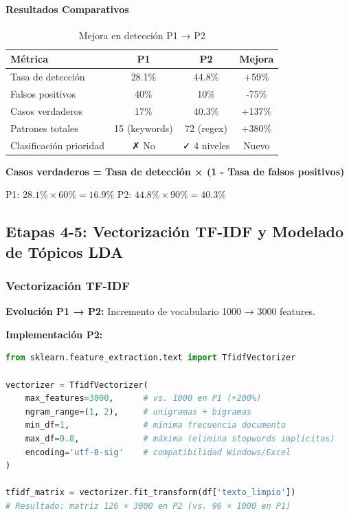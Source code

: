 \paragraph{Resultados Comparativos}

\begin{table}[h]
\centering
\caption{Mejora en detección P1 → P2}
\begin{tabular}{|l|c|c|c|}
\hline
\textbf{Métrica} & \textbf{P1} & \textbf{P2} & \textbf{Mejora} \\ \hline
Tasa de detección & 28.1\% & 44.8\% & +59\% \\ \hline
Falsos positivos & 40\% & 10\% & -75\% \\ \hline
Casos verdaderos & 17\% & 40.3\% & +137\% \\ \hline
Patrones totales & 15 (keywords) & 72 (regex) & +380\% \\ \hline
Clasificación prioridad & ✗ No & ✓ 4 niveles & Nuevo \\ \hline
\end{tabular}
\end{table}

\textbf{Casos verdaderos = Tasa de detección × (1 - Tasa de falsos positivos)}

P1: $28.1\% \times 60\% = 16.9\%$  
P2: $44.8\% \times 90\% = 40.3\%$

\subsection{Etapas 4-5: Vectorización TF-IDF y Modelado de Tópicos LDA}
\label{subsec:impl_vectorizacion}

\subsubsection{Vectorización TF-IDF}

\textbf{Evolución P1 → P2:} Incremento de vocabulario 1000 → 3000 features.

\textbf{Implementación P2:}

\begin{lstlisting}[language=Python, caption={Configuración TF-IDF del P2}]
from sklearn.feature_extraction.text import TfidfVectorizer

vectorizer = TfidfVectorizer(
    max_features=3000,      # vs. 1000 en P1 (+200%)
    ngram_range=(1, 2),     # unigramas + bigramas
    min_df=1,               # mínima frecuencia documento
    max_df=0.8,             # máxima (elimina stopwords implícitas)
    encoding='utf-8-sig'    # compatibilidad Windows/Excel
)

tfidf_matrix = vectorizer.fit_transform(df['texto_limpio'])
# Resultado: matriz 126 × 3000 en P2 (vs. 96 × 1000 en P1)
\end{lstlisting}

